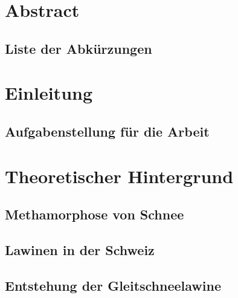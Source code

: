 \documentclass[a4paper,12pt]{article}
\begin{document}
\begin{titlepage}
  \end{titlepage}



\pagestyle{empty}
\section*{Abstract}


\newpage
\subsection*{Liste der Abkürzungen}

\newpage
\tableofcontents
\newpage
\pagestyle{fancy}

\setcounter{page}{1}
\section{Einleitung}


\subsection{Aufgabenstellung für die Arbeit}
\label{sec:aufgabe}


\newpage
\section{Theoretischer Hintergrund}

\subsection{Methamorphose von Schnee}


\newpage
\subsection{Lawinen in der Schweiz}


\subsection{Entstehung der Gleitschneelawine}


%
\newpage
\end{document}
